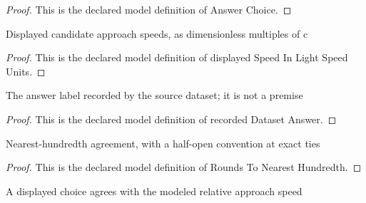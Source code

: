 \begin{proof}
  This is the declared model definition of Answer Choice.
\end{proof}
\begin{definition}
  \label{def:physics:phyx-mini-0591:phyxminiproblems-problemphyxmini0591-displayedspeedinlightspeedunits}
  Displayed candidate approach speeds, as dimensionless multiples of c
\end{definition}
\begin{proof}
  This is the declared model definition of displayed Speed In Light Speed Units.
\end{proof}
\begin{definition}
  \label{def:physics:phyx-mini-0591:phyxminiproblems-problemphyxmini0591-recordeddatasetanswer}
  The answer label recorded by the source dataset; it is not a premise
\end{definition}
\begin{proof}
  This is the declared model definition of recorded Dataset Answer.
\end{proof}
\begin{definition}
  \label{def:physics:phyx-mini-0591:phyxminiproblems-problemphyxmini0591-roundstonearesthundredth}
  Nearest-hundredth agreement, with a half-open convention at exact ties
\end{definition}
\begin{proof}
  This is the declared model definition of Rounds To Nearest Hundredth.
\end{proof}
\begin{definition}
  \label{def:physics:phyx-mini-0591:phyxminiproblems-problemphyxmini0591-matchesanswerchoice}
  A displayed choice agrees with the modeled relative approach speed
\end{definition}
